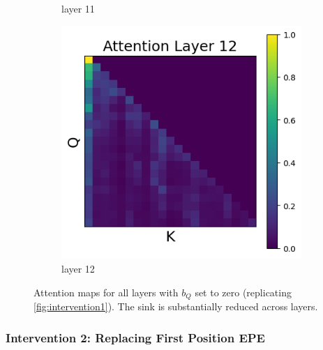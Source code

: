 \documentclass[11pt]{article}
\begin{document}
\begin{figure}[t]
\begin{subfigure}[t]{0.24\textwidth}
    \caption{layer 11}
  \end{subfigure}\hfill
  \begin{subfigure}[t]{0.24\textwidth}
    \centering
    \includegraphics[width=1.4\columnwidth]{figures/intervention1/layer_12.png}
    \caption{layer 12}
  \end{subfigure}\hfill

  \caption{Attention maps for all layers with $b_Q$ set to zero (replicating \cref{fig:intervention1}). The sink is substantially reduced across layers.}
\end{figure}


\subsubsection{Intervention 2: Replacing First Position EPE}\label{app:intervention2}
\end{document}

